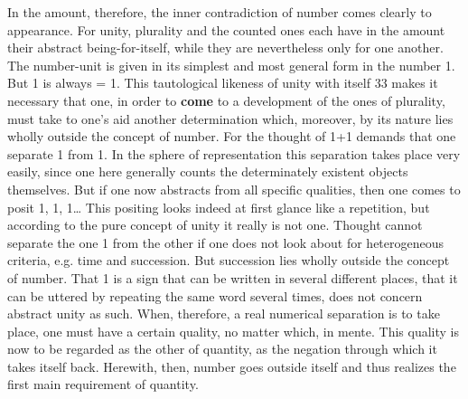 \documentclass[12pt,a4paper,openany]{book}
\newcommand{\opage}[1]{\marginnote{\footnotesize\textit{[#1]}}}
\begin{document}
In the amount, therefore, the inner contradiction of number comes
clearly to appearance. For unity, plurality and the counted ones
each have in the amount their abstract being-for-itself,
while they are nevertheless only for one another.
The number-unit is given in its simplest and most general
form in the number 1. But 1 is always = 1.
This tautological likeness of unity with itself
\setcounter{footnote}{0}%
\opage{35}33
makes it necessary that one, in order to \textbf{come} to a development
of the ones of plurality, must take to one's aid another determination which, moreover, by its nature lies wholly
outside the concept of number. For the thought of 1+1 demands that one separate 1 from 1. In the sphere of
representation this separation takes place very
easily, since one here generally counts the determinately existent
objects themselves. But if one now abstracts from
all specific qualities, then one comes to posit
1, 1, 1\dots{} This positing looks indeed at first glance
like a repetition, but according to the pure
concept of unity it really is not one. Thought cannot separate
the one 1 from the other if one does not look about
for heterogeneous criteria, e.g. time and succession. But succession lies wholly outside the concept of
number. That 1 is a sign that can be written in several different
places, that it can be uttered by repeating
the same word several times, does not concern abstract
unity as such. When, therefore, a real
numerical separation is to take place, one must have a certain
quality, no matter which, in mente. This quality
is now to be regarded as the other of quantity, as the
negation through which it takes itself back.
Herewith, then, number goes outside itself and thus realizes
the first main requirement of quantity.
\end{document}
